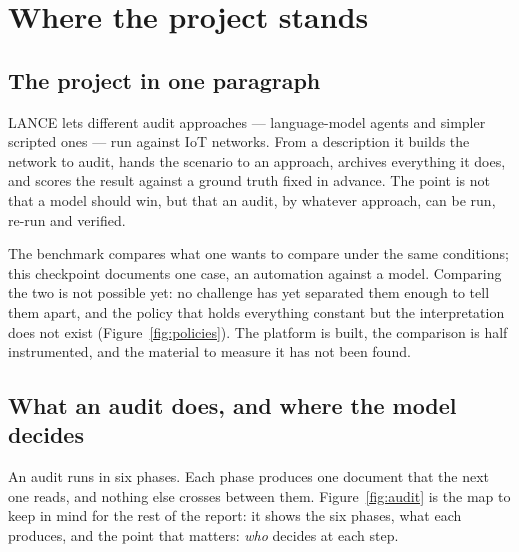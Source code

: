 \section{Where the project stands}
\label{sec:etat}

\subsection{The project in one paragraph}

LANCE lets different audit approaches --- language-model agents and simpler
scripted ones --- run against IoT networks. From a description it builds the
network to audit, hands the scenario to an approach, archives everything it does,
and scores the result against a ground truth fixed in advance. The point is not
that a model should win, but that an audit, by whatever approach, can be run,
re-run and verified.

The benchmark compares what one wants to compare under the same conditions; this
checkpoint documents one case, an automation against a model. Comparing the two is
not possible yet: no challenge has yet separated them enough to tell them apart, and
the policy that holds everything constant but the interpretation does not exist
(Figure~\ref{fig:policies}). The platform is built, the comparison is half
instrumented, and the material to measure it has not been found.

\subsection{What an audit does, and where the model decides}
\label{sec:parcours}

An audit runs in six phases. Each phase produces one document that the next one
reads, and nothing else crosses between them. Figure~\ref{fig:audit} is the map to
keep in mind for the rest of the report: it shows the six phases, what each
produces, and the point that matters: \emph{who} decides at each step.

